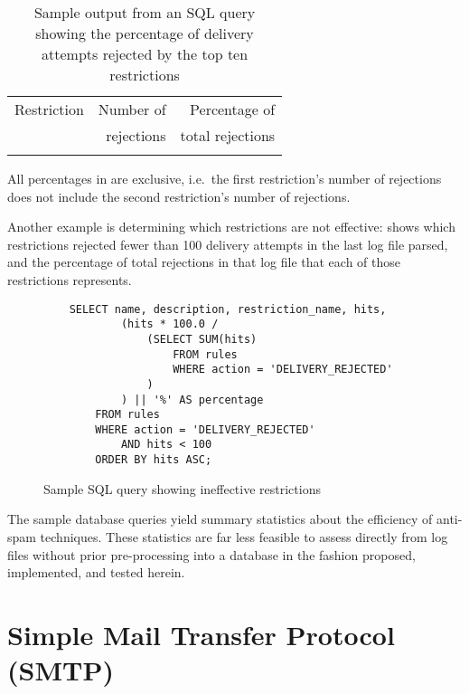 \begin{table}[thbp]
    \caption{Sample output from an SQL query showing the percentage of
    delivery attempts rejected by the top ten restrictions}
    \empty{}\label{Sample output from SQL query}
    \begin{tabular}[]{lrr}
        \tabletopline{}%
        Restriction & Number of  & Percentage of    \\
                    & rejections & total rejections \\
        \tablemiddleline{}%
        
        \tablebottomline{}%
    \end{tabular}

    All percentages in  are
    exclusive, i.e.\ the first restriction's number of rejections does not
    include the second restriction's number of rejections.

\end{table}


Another example is determining which restrictions are not effective:
 shows which
restrictions rejected fewer than 100 delivery attempts in the last log file
parsed, and the percentage of total rejections in that log file that each
of those restrictions represents.

\begin{figure}[thbp]
    \caption{Sample SQL query showing ineffective restrictions}
    \empty{}\label{Sample SQL query showing ineffective restrictions}
    \begin{verbatim}
    SELECT name, description, restriction_name, hits,
            (hits * 100.0 /
                (SELECT SUM(hits)
                    FROM rules
                    WHERE action = 'DELIVERY_REJECTED'
                )
            ) || '%' AS percentage
        FROM rules
        WHERE action = 'DELIVERY_REJECTED'
            AND hits < 100
        ORDER BY hits ASC;
    \end{verbatim}
\end{figure}

The sample database queries yield summary statistics about the efficiency of
anti-spam techniques.  These statistics are far less feasible to assess
directly from log files without prior pre-processing into a database in the
fashion proposed, implemented, and tested herein.

\section{Simple Mail Transfer Protocol (SMTP)}


